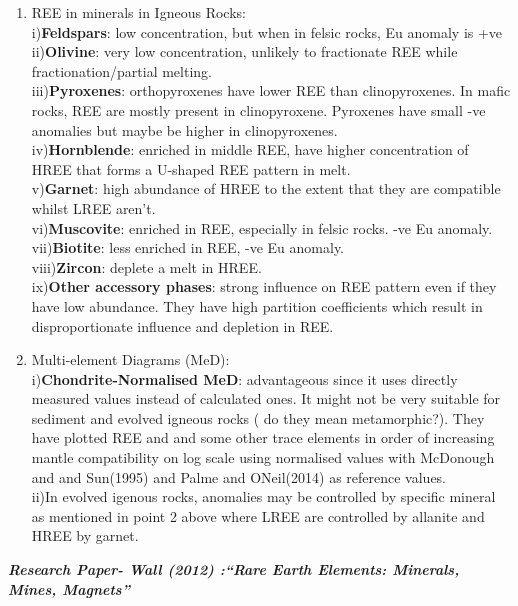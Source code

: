 \documentclass[
]{article}
\begin{document}
\begin{enumerate}
\def\labelenumi{\arabic{enumi}.}
\setcounter{enumi}{1}
\item
  REE in minerals in Igneous Rocks:\\
  i)\textbf{Feldspars}: low concentration, but when in felsic rocks, Eu
  anomaly is +ve\\
  ii)\textbf{Olivine}: very low concentration, unlikely to fractionate
  REE while fractionation/partial melting.\\
  iii)\textbf{Pyroxenes}: orthopyroxenes have lower REE than
  clinopyroxenes. In mafic rocks, REE are mostly present in
  clinopyroxene. Pyroxenes have small -ve anomalies but maybe be higher
  in clinopyroxenes.\\
  iv)\textbf{Hornblende}: enriched in middle REE, have higher
  concentration of HREE that forms a U-shaped REE pattern in melt.\\
  v)\textbf{Garnet}: high abundance of HREE to the extent that they are
  compatible whilst LREE aren't.\\
  vi)\textbf{Muscovite}: enriched in REE, especially in felsic rocks.
  -ve Eu anomaly.\\
  vii)\textbf{Biotite}: less enriched in REE, -ve Eu anomaly.\\
  viii)\textbf{Zircon}: deplete a melt in HREE.\\
  ix)\textbf{Other accessory phases}: strong influence on REE pattern
  even if they have low abundance. They have high partition coefficients
  which result in disproportionate influence and depletion in REE.
\item
  Multi-element Diagrams (MeD):\\
  i)\textbf{Chondrite-Normalised MeD}: advantageous since it uses
  directly measured values instead of calculated ones. It might not be
  very suitable for sediment and evolved igneous rocks ( do they mean
  metamorphic?). They have plotted REE and and some other trace elements
  in order of increasing mantle compatibility on log scale using
  normalised values with McDonough and and Sun(1995) and Palme and
  ONeil(2014) as reference values.\\
  ii)In evolved igenous rocks, anomalies may be controlled by specific
  mineral as mentioned in point 2 above where LREE are controlled by
  allanite and HREE by garnet.
\end{enumerate}

\textbf{\emph{Research Paper- Wall (2012) :``Rare Earth Elements:
Minerals, Mines, Magnets''}}
\end{document}
